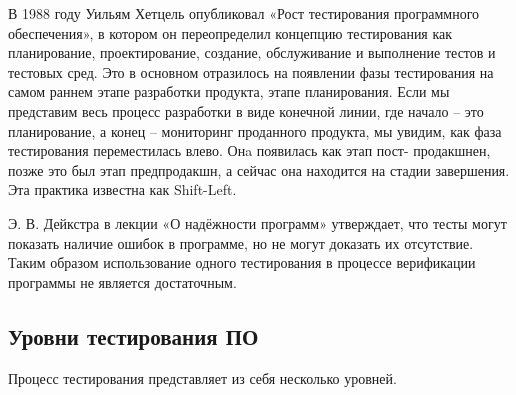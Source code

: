 В 1988 году Уильям Хетцель опубликовал «Рост тестирования программного обеспечения»\cite{Hetzel}, в котором 
он переопределил концепцию тестирования как планирование, проектирование, создание, обслуживание 
и выполнение тестов и тестовых сред. Это  в основном отразилось на появлении фазы тестирования 
на самом раннем этапе разработки продукта, этапе планирования. Если мы представим весь процесс 
разработки в виде конечной линии, где начало -- это планирование, а конец -- мониторинг проданного 
продукта, мы увидим, как фаза тестирования переместилась влево. Онa появилась как этап пост-
продакшнен, позже это был этап предпродакшн, а сейчас она находится на стадии завершения. Эта 
практика известна как Shift-Left.

Э. В. Дейкстра в лекции «О надёжности программ» утверждает, что тесты могут показать наличие 
ошибок в программе, но не могут доказать их отсутствие\cite{Dijkstra}. Таким образом 
использование одного тестирования в процессе верификации программы не является достаточным. 

\subsection{Уровни тестирования ПО}
Процесс тестирования представляет из себя несколько уровней. 

